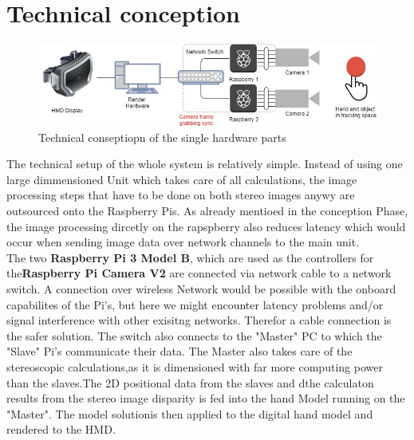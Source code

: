 \section{Technical conception}
\begin{figure}[H]
\includegraphics[width=\textwidth]{images/technical_setup.jpg}
\caption{Technical conseptiopn of the single hardware parts}
\label{technical-copnception}
\end{figure} 
The technical setup of the whole system is relatively simple. Instead of using one large dimmensioned Unit which takes care of all calculations, the image processing steps that have to be done on both stereo images anywy are outsourced onto the Raspberry Pis. As already mentioed in the conception Phase, the image processing dircetly on the rapspberry also reduces latency which would occur when sending image data over network channels to the main unit.\\
The two \textbf{Raspberry Pi 3 Model B}, which are used as the controllers for the\textbf{Raspberry Pi Camera V2} are connected via network cable to a network switch. A connection over wireless Network would be possible with the onboard capabilites of the  Pi's, but here we might encounter latency problems and/or signal interference with other exisitng networks. Therefor a cable connection is the safer solution.
The switch also connects to the "Master" PC to which the "Slave" Pi's communicate their data. The Master also takes care of the stereoscopic calculations,as it is dimensioned with far more computing power than the slaves.The 2D positional data from the slaves and dthe calculaton results from the stereo image disparity is fed into the hand Model running on the "Master". The model solutionis then applied to the digital hand model and rendered to the HMD.

 




